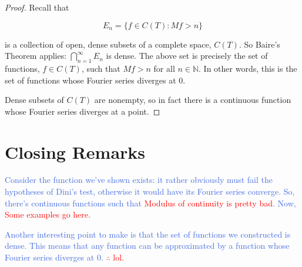 \documentclass{amsart}
\newcommand{\N}{\mathbb{N}}
\newcommand{\colorcomment}[2]{\textcolor{#1}{#2}} %
\theoremstyle{definition}
\begin{document}
\begin{proof}

Recall that 

\begin{displaymath}
E_n = \{f \in C(T) : Mf > n\}
\end{displaymath}

is a collection of open, dense subsets of a complete space, $C(T)$. 
So Baire's Theorem applies: $\bigcap\limits_{n=1}^\infty E_n $ is dense.
The above set is precisely the set of functions, $f \in C(T)$, such that $Mf >n$ for all $n \in \N$.
In other words, this is the set of functions whose Fourier series diverges at $0$.

Dense subsets of $C(T)$ are nonempty, so in fact there is a continuous function whose Fourier series diverges at a point.

\end{proof}

\section{Closing Remarks}

\colorcomment{RoyalBlue}{Consider the function we've shown exists: it rather obviously must fail the hypotheses of Dini's test, otherwise it would have its Fourier series converge. 
So, there's continuous functions such that \colorcomment{red}{Modulus of continuity is pretty bad}.
Now, \colorcomment{red}{Some examples go here.}}

\colorcomment{RoyalBlue}{Another interesting point to make is that the set of functions we constructed is dense. 
This means that any function can be approximated by a function whose Fourier series diverges at $0$. 
\colorcomment{red}{$\therefore$ lol.}}
\end{document}
